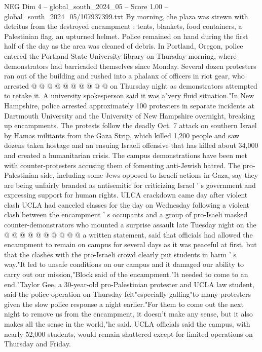 \begin{textsample}{NEG Dim 4 – global\_south\_2024\_05 – Score 1.00 – global\_south\_2024\_05/107937399.txt}
By morning, the plaza was strewn with detritus from the destroyed encampment : tents, blankets, food containers, a Palestinian flag, an upturned helmet.
Police remained on hand during the first half of the day as the area was cleaned of debris.
In Portland, Oregon, police entered the Portland State University library on Thursday morning, where demonstrators had barricaded themselves since Monday.
Several dozen protesters ran out of the building and rushed into a phalanx of officers in riot gear, who arrested @ @ @ @ @ @ @ @ @ @ on Thursday night as demonstrators attempted to retake it.
A university spokesperson said it was a"very fluid situation."In New Hampshire, police arrested approximately 100 protesters in separate incidents at Dartmouth University and the University of New Hampshire overnight, breaking up encampments.
The protests follow the deadly Oct. 7 attack on southern Israel by Hamas militants from the Gaza Strip, which killed 1,200 people and saw dozens taken hostage and an ensuing Israeli offensive that has killed about 34,000 and created a humanitarian crisis.
The campus demonstrations have been met with counter-protesters accusing them of fomenting anti-Jewish hatred.
The pro-Palestinian side, including some Jews opposed to Israeli actions in Gaza, say they are being unfairly branded as antisemitic for criticizing Israel ' s government and expressing support for human rights.
ULCA crackdown came day after violent clash UCLA had canceled classes for the day on Wednesday following a violent clash between the encampment ' s occupants and a group of pro-Isaeli masked counter-demonstrators who mounted a surprise assault late Tuesday night on the @ @ @ @ @ @ @ @ @ @ a written statement, said that officials had allowed the encampment to remain on campus for several days as it was peaceful at first, but that the clashes with the pro-Israeli crowd clearly put students in harm ' s way."It led to unsafe conditions on our campus and it damaged our ability to carry out our mission,"Block said of the encampment."It needed to come to an end."Taylor Gee, a 30-year-old pro-Palestinian protester and UCLA law student, said the police operation on Thursday felt"especially galling"to many protesters given the slow police response a night earlier."For them to come out the next night to remove us from the encampment, it doesn't make any sense, but it also makes all the sense in the world,"he said.
UCLA officials said the campus, with nearly 52,000 students, would remain shuttered except for limited operations on Thursday and Friday.

\end{textsample}
